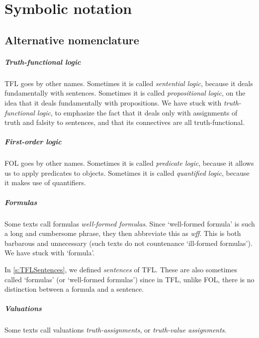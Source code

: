 
\chapter{Symbolic notation}
\label{app.notation}

\section{Alternative nomenclature}

\paragraph{Truth-functional logic} TFL goes by other names. Sometimes it is called \emph{sentential logic}, because it deals fundamentally with sentences. Sometimes it is called \emph{propositional logic}, on the idea that it deals fundamentally with propositions. We have stuck with \emph{truth-functional logic}, to emphasize the fact that it deals only with assignments of truth and falsity to sentences, and that its connectives are all truth-functional.

\paragraph{First-order logic} FOL goes by other names. Sometimes it is called \emph{predicate logic}, because it allows us to apply  predicates to objects. Sometimes it is called \emph{quantified logic}, because it makes use of quantifiers.

\paragraph{Formulas} Some texts call formulas \emph{well-formed formulas}. Since `well-formed formula' is such a long and cumbersome phrase, they then abbreviate this as \emph{wff}. This is both barbarous and unnecessary (such texts do not countenance `ill-formed formulas'). We have stuck with `formula'.

In \cref{s:TFLSentences}, we defined \emph{sentences} of TFL. These are also sometimes called `formulas' (or `well-formed formulas') since in TFL, unlike FOL, there is no distinction between a formula and a sentence.

\paragraph{Valuations} Some texts call valuations \emph{truth-assignments}, or \emph{truth-value assignments}.

